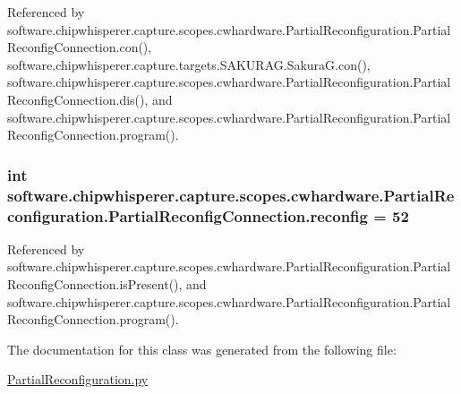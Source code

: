 Referenced by software.\+chipwhisperer.\+capture.\+scopes.\+cwhardware.\+Partial\+Reconfiguration.\+Partial\+Reconfig\+Connection.\+con(), software.\+chipwhisperer.\+capture.\+targets.\+S\+A\+K\+U\+R\+A\+G.\+Sakura\+G.\+con(), software.\+chipwhisperer.\+capture.\+scopes.\+cwhardware.\+Partial\+Reconfiguration.\+Partial\+Reconfig\+Connection.\+dis(), and software.\+chipwhisperer.\+capture.\+scopes.\+cwhardware.\+Partial\+Reconfiguration.\+Partial\+Reconfig\+Connection.\+program().

\hypertarget{classsoftware_1_1chipwhisperer_1_1capture_1_1scopes_1_1cwhardware_1_1PartialReconfiguration_1_1PartialReconfigConnection_a089235cff76fde763c21b9aabe9873f5}{}
\subsubsection[{reconfig}]{\setlength{\rightskip}{0pt plus 5cm}int software.\+chipwhisperer.\+capture.\+scopes.\+cwhardware.\+Partial\+Reconfiguration.\+Partial\+Reconfig\+Connection.\+reconfig = 52\hspace{0.3cm}{\ttfamily [static]}}\label{classsoftware_1_1chipwhisperer_1_1capture_1_1scopes_1_1cwhardware_1_1PartialReconfiguration_1_1PartialReconfigConnection_a089235cff76fde763c21b9aabe9873f5}


Referenced by software.\+chipwhisperer.\+capture.\+scopes.\+cwhardware.\+Partial\+Reconfiguration.\+Partial\+Reconfig\+Connection.\+is\+Present(), and software.\+chipwhisperer.\+capture.\+scopes.\+cwhardware.\+Partial\+Reconfiguration.\+Partial\+Reconfig\+Connection.\+program().



The documentation for this class was generated from the following file\+:\begin{DoxyCompactItemize}
\item 
\hyperlink{PartialReconfiguration_8py}{Partial\+Reconfiguration.\+py}\end{DoxyCompactItemize}
